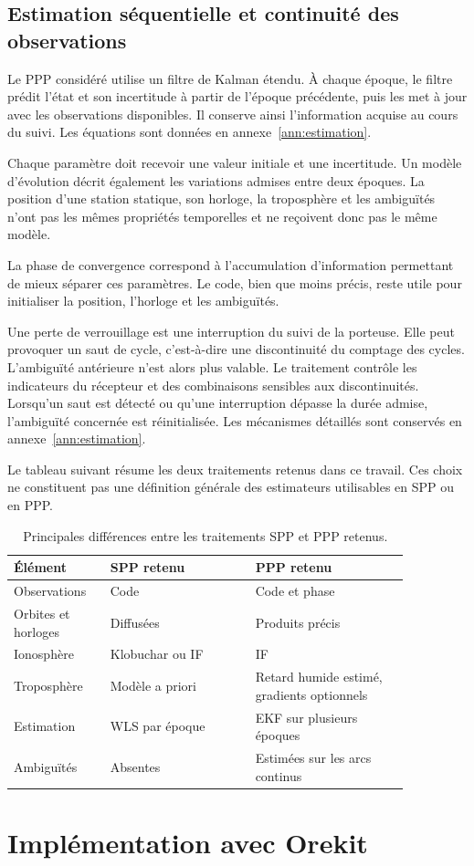 \subsection{Estimation séquentielle et continuité des observations}

Le PPP considéré utilise un filtre de Kalman étendu. À chaque époque, le
filtre prédit l'état et son incertitude à partir de l'époque précédente, puis
les met à jour avec les observations disponibles. Il conserve ainsi
l'information acquise au cours du suivi. Les équations sont données en
annexe~\ref{ann:estimation}.

Chaque paramètre doit recevoir une valeur initiale et une incertitude.
Un modèle d'évolution décrit également les variations admises entre deux
époques. La position d'une station statique, son horloge, la troposphère et
les ambiguïtés n'ont pas les mêmes propriétés temporelles et ne reçoivent
donc pas le même modèle.

La phase de convergence correspond à l'accumulation d'information permettant
de mieux séparer ces paramètres. Le code, bien que moins précis, reste utile
pour initialiser la position, l'horloge et les ambiguïtés.

Une perte de verrouillage est une interruption du suivi de la porteuse.
Elle peut provoquer un saut de cycle, c'est-à-dire une discontinuité du
comptage des cycles. L'ambiguïté antérieure n'est alors plus valable.
Le traitement contrôle les indicateurs du récepteur et des combinaisons
sensibles aux discontinuités. Lorsqu'un saut est détecté ou qu'une interruption
dépasse la durée admise, l'ambiguïté concernée est réinitialisée.
Les mécanismes détaillés sont conservés en annexe~\ref{ann:estimation}.

Le tableau suivant résume les deux traitements retenus dans ce travail.
Ces choix ne constituent pas une définition générale des estimateurs
utilisables en SPP ou en PPP.

\begin{table}[htbp]
\centering
\small
\begin{tabular}{|p{0.20\linewidth}|p{0.32\linewidth}|p{0.34\linewidth}|}
\hline
Élément & SPP retenu & PPP retenu \\\hline
Observations & Code & Code et phase \\\hline
Orbites et horloges & Diffusées & Produits précis \\\hline
Ionosphère & Klobuchar ou IF & IF \\\hline
Troposphère & Modèle a priori & Retard humide estimé, gradients optionnels \\\hline
Estimation & WLS par époque & EKF sur plusieurs époques \\\hline
Ambiguïtés & Absentes & Estimées sur les arcs continus \\\hline
\end{tabular}
\caption{Principales différences entre les traitements SPP et PPP retenus.}
\label{new:summary}
\end{table}

\section{Implémentation avec Orekit}
\label{sec:implementation_nouvelle}
